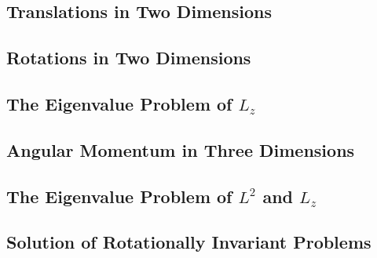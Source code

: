 \subsection{Translations in Two Dimensions}

\subsection{Rotations in Two Dimensions}

\subsection[The Eigenvalue Problem of Lz]{The Eigenvalue Problem of $L_z$}

\subsection{Angular Momentum in Three Dimensions}

\subsection[The Eigenvalue Problem of L2 and Lz]{The Eigenvalue Problem of $L^2$ and $L_z$}

\subsection{Solution of Rotationally Invariant Problems}
